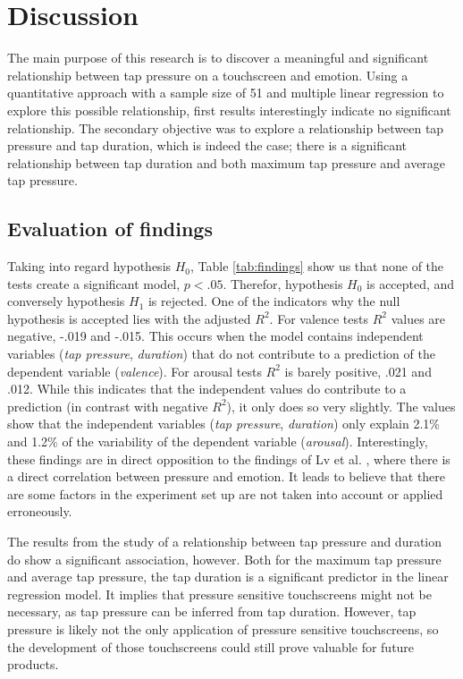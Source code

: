 \documentclass{sigchi}
\begin{document}
\section{Discussion} %
\label{sec:discussion}
The main purpose of this research is to discover a meaningful and significant relationship between tap pressure on a touchscreen and emotion. Using a quantitative approach with a sample size of 51 and multiple linear regression to explore this possible relationship, first results interestingly indicate no significant relationship. The secondary objective was to explore a relationship between tap pressure and tap duration, which is indeed the case; there is a significant relationship between tap duration and both maximum tap pressure and average tap pressure. 

\subsection{Evaluation of findings} %
\label{sub:evaluation_of_findings}
Taking into regard hypothesis $H_0$, Table \ref{tab:findings} show us that none of the tests create a significant model, $p < .05$. Therefor, hypothesis $H_0$ is accepted, and conversely hypothesis $H_1$ is rejected. One of the indicators why the null hypothesis is accepted lies with the adjusted $R^2$. For valence tests $R^2$ values are negative, -.019 and -.015. This occurs when the model contains independent variables (\textit{tap pressure}, \textit{duration}) that do not contribute to a prediction of the dependent variable (\textit{valence}). For arousal tests $R^2$ is barely positive, .021 and .012. While this indicates that the independent values do contribute to a prediction (in contrast with negative $R^2$), it only does so very slightly. The values show that the independent variables (\textit{tap pressure}, \textit{duration}) only explain 2.1\% and 1.2\% of the variability of the dependent variable (\textit{arousal}). Interestingly, these findings are in direct opposition to the findings of Lv et al. \cite{H.R.LvZ.L.LinW.J.Yin2008}, where there is a direct correlation between pressure and emotion. It leads to believe that there are some factors in the experiment set up are not taken into account or applied erroneously.

The results from the study of a relationship between tap pressure and duration do show a significant association, however. Both for the maximum tap pressure and average tap pressure, the tap duration is a significant predictor in the linear regression model. It implies that pressure sensitive touchscreens might not be necessary, as tap pressure can be inferred from tap duration. However, tap pressure is likely not the only application of pressure sensitive touchscreens, so the development of those touchscreens could still prove valuable for future products.
\end{document}

